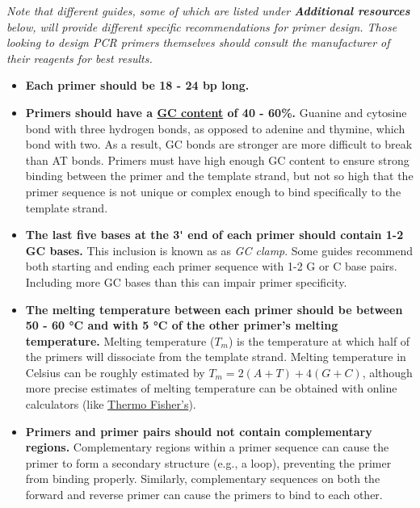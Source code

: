 \documentclass[letterpaper, 12pt]{article}
\begin{document}
\textit{Note that different guides, some of which are listed under \textbf{Additional resources} below, will provide different specific recommendations for primer design. Those looking to design PCR primers themselves should consult the manufacturer of their reagents for best results.}

\begin{itemize}
    \setlength\itemsep{-0.5em}
    \item \textbf{Each primer should be 18 - 24 bp long.}
    \item \textbf{Primers should have a \href{https://en.wikipedia.org/wiki/GC-content}{GC content} of 40 - 60\%.} Guanine and cytosine bond with three hydrogen bonds, as opposed to adenine and thymine, which bond with two. As a result, GC bonds are stronger are more difficult to break than AT bonds. Primers must have high enough GC content to ensure strong binding between the primer and the template strand, but not so high that the primer sequence is not unique or complex enough to bind specifically to the template strand.
    \item \textbf{The last five bases at the 3\'{} end of each primer should contain 1-2 GC bases.} This inclusion is known as as \emph{GC clamp}. Some guides recommend both starting and ending each primer sequence with 1-2 G or C base pairs. Including more GC bases than this can impair primer specificity. 
    \item \textbf{The melting temperature between each primer should be between 50 - 60 °C and with 5 °C of the other primer's melting temperature.} Melting temperature ($T_m$) is the temperature at which half of the primers will dissociate from the template strand. Melting temperature in Celsius can be roughly estimated by $T_m = 2(A+T) + 4(G+C)$, although more precise estimates of melting temperature can be obtained with online calculators (like \href{https://www.thermofisher.com/us/en/home/brands/thermo-scientific/molecular-biology/molecular-biology-learning-center/molecular-biology-resource-library/thermo-scientific-web-tools/tm-calculator.html}{Thermo Fisher's}).
    \item \textbf{Primers and primer pairs should not contain complementary regions.} Complementary regions within a primer sequence can cause the primer to form a secondary structure (e.g., a loop), preventing the primer from binding properly. Similarly, complementary sequences on both the forward and reverse primer can cause the primers to bind to each other.
\end{itemize}
\end{document}
